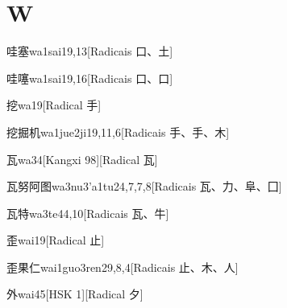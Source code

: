 
\section*{W}

\begin{entry}{哇塞}{wa1sai1}{9,13}[Radicais ⼝、⼟]
\end{entry}

\begin{entry}{哇噻}{wa1sai1}{9,16}[Radicais ⼝、⼝]
\end{entry}

\begin{entry}{挖}{wa1}{9}[Radical ⼿]
\end{entry}

\begin{entry}{挖掘机}{wa1jue2ji1}{9,11,6}[Radicais ⼿、⼿、⽊]
\end{entry}

\begin{entry}{瓦}{wa3}{4}[Kangxi 98][Radical ⽡]
\end{entry}

\begin{entry}{瓦努阿图}{wa3nu3'a1tu2}{4,7,7,8}[Radicais ⽡、⼒、⾩、⼞]
\end{entry}

\begin{entry}{瓦特}{wa3te4}{4,10}[Radicais ⽡、⽜]
\end{entry}

\begin{entry}{歪}{wai1}{9}[Radical ⽌]
\end{entry}

\begin{entry}{歪果仁}{wai1guo3ren2}{9,8,4}[Radicais ⽌、⽊、⼈]
\end{entry}

\begin{entry}{外}{wai4}{5}[HSK 1][Radical ⼣]
\end{entry}

